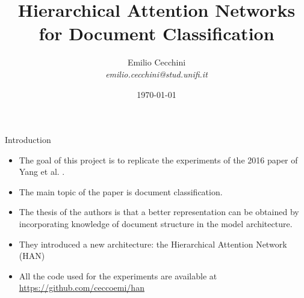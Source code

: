 \documentclass[10pt]{beamer}
\title{Hierarchical Attention Networks for Document Classification}
\date{\today}
\author{Emilio Cecchini \\ \textit{emilio.cecchini@stud.unifi.it}}
\institute{Università degli Studi di Firenze}
\begin{document}
\maketitle


\begin{frame}{Introduction}

\begin{itemize}
\item
The goal of this project is to replicate the experiments of the 2016 paper of Yang et al. \cite{yang2016hierarchical}.
\item
The main topic of the paper is document classification.
\item
The thesis of the authors is that a better representation can be obtained by incorporating knowledge of document structure in the model architecture.
\item
They introduced a new architecture: the Hierarchical Attention Network (HAN)
\item
All the code used for the experiments are available at \url{https://github.com/ceccoemi/han}
\end{itemize}

\end{frame}


%
%
%
\end{document}
